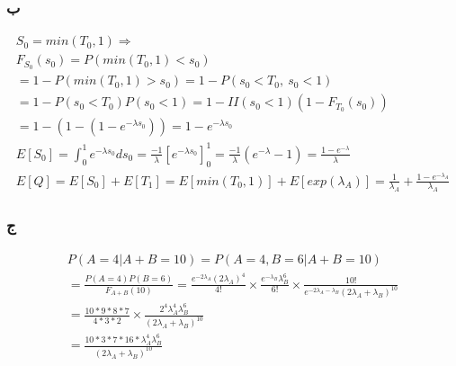 \documentclass{article}[12pt]
\begin{document}
\subsubsection{ب}

\begin{equation}
	\begin{gathered}
			S_{0} =min( T_{0} ,1) \Longrightarrow \\
			F_{S_{0}}( s_{0}) =P( min( T_{0} ,1) < s_{0})\\
			=1-P( min( T_{0} ,1)  >s_{0}) =1-P( s_{0} < T_{0} ,\ s_{0} < 1)\\
			=1-P( s_{0} < T_{0}) P( s_{0} < 1) =1-II( s_{0} < 1)( 1-F_{T_{0}}( s_{0}))\\
			=1-\left( 1-\left( 1-e^{-\lambda s_{0}}\right)\right) =1-e^{-\lambda s_{0}}\\
			E[ S_{0}] =\int _{0}^{1} e^{-\lambda s_{0}} ds_{0} =\frac{-1}{\lambda }\left[ e^{-\lambda s_{0}}\right]_{0}^{1} =\frac{-1}{\lambda }\left( e^{-\lambda } -1\right) =\frac{1-e^{-\lambda }}{\lambda }\\
			E[ Q] =E[ S_{0}] +E[ T_{1}] =E[ min( T_{0} ,1)] +E[ exp( \lambda _{A})] =\frac{1}{\lambda_A } +\frac{1-e^{-\lambda_A }}{\lambda_A }
	\end{gathered}
\end{equation}

\subsubsection{ج}

\begin{equation}
	\begin{gathered}
			P( A=4|A+B=10) =P( A=4,B=6|A+B=10)\\
			=\frac{P( A=4) P( B=6)}{F_{A+B}( 10)} =\frac{e^{-2\lambda _{A}}( 2\lambda _{A})^{4}}{4!} \times \frac{e^{-\lambda _{B}} \lambda _{B}^{6}}{6!} \times \frac{10!}{e^{-2\lambda _{A} -\lambda _{B}}( 2\lambda _{A} +\lambda _{B})^{10}}\\
			=\frac{10*9*8*7}{4*3*2} \times \frac{2^{4} \lambda _{A}^{4} \lambda _{B}^{6}}{( 2\lambda _{A} +\lambda _{B})^{10}}\\
			=\frac{10*3*7*16*\lambda _{A}^{4} \lambda _{B}^{6}}{( 2\lambda _{A} +\lambda _{B})^{10}}
	\end{gathered}
\end{equation}
\end{document}
